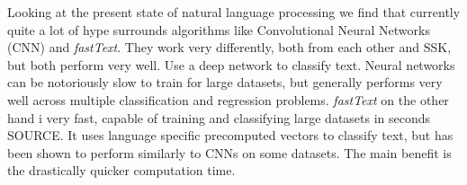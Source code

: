 Looking at the present state of natural language processing we find that currently quite a lot of hype surrounds algorithms like Convolutional Neural Networks (CNN) and \textit{fastText}. They work very differently, both from each other and SSK, but both perform very well. Use a deep network to classify text. Neural networks can be notoriously slow to train for large datasets, but generally performs very well across multiple classification and regression problems. \textit{fastText} on the other hand i very fast, capable of training and classifying large datasets in seconds SOURCE. It uses language specific precomputed vectors to classify text, but has been shown to perform similarly to CNNs on some datasets. The main benefit is the drastically quicker computation time.

